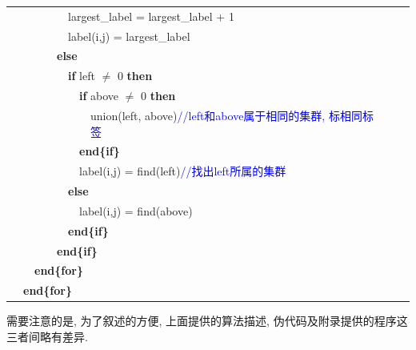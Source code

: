 \documentclass[11pt,a4paper,boxed]{caspset}
\begin{document}
\begin{itemize}
\begin{table}[!htb]
{\begin{tabular}{|llllllllll|}
 &  &  &  &  & \multicolumn{5}{l|}{largest\_label = largest\_label + 1 } \\
 &  &  &  &  & \multicolumn{5}{l|}{label(i,j) = largest\_label} \\
 &  &  &  & \multicolumn{6}{l|}{ \textbf{else}} \\
 &  &  &  &  & \multicolumn{5}{l|}{ \textbf{if} left $\neq$ 0  \textbf{then}} \\
 &  &  &  &  &  & \multicolumn{4}{l|}{ \textbf{if} above $\neq$ 0  \textbf{then}} \\
 &  &  &  &  &  &  & \multicolumn{3}{l|}{union(left, above)\textcolor{blue}{//left和above属于相同的集群, 标相同标签{~~~~}}} \\
 &  &  &  &  &  & \multicolumn{4}{l|}{\textbf{end\{if\}}} \\
 &  &  &  &  &  & \multicolumn{4}{l|}{label(i,j) = find(left)\textcolor{blue}{//找出left所属的集群} } \\
 &  &  &  &  & \multicolumn{5}{l|}{ \textbf{else}} \\
 &  &  &  &  &  & \multicolumn{4}{l|}{label(i,j) = find(above)} \\
 &  &  &  &  & \multicolumn{5}{l|}{ \textbf{end\{if\}}} \\
 &  &  &  & \multicolumn{6}{l|}{ \textbf{end\{if\}}} \\
 &  & \multicolumn{8}{l|}{ \textbf{end\{for\}}} \\
 & \multicolumn{9}{l|}{ \textbf{end\{for\}}} \\
\hline
\end{tabular}}
\end{table}
\end{itemize}
需要注意的是, 为了叙述的方便, 上面提供的算法描述, 伪代码及附录提供的程序这三者间略有差异.
\end{document}
